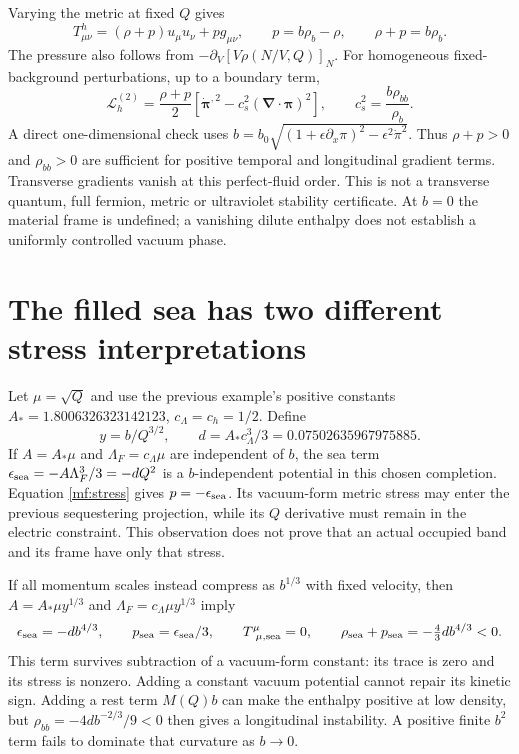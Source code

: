 \documentclass[11pt]{article}
\begin{document}
Varying the metric at fixed $Q$ gives
\begin{equation}
 T_{\mu\nu}^{h}=(\rho+p)u_\mu u_\nu+p g_{\mu\nu},\qquad
 p=b\rho_b-\rho,\qquad \rho+p=b\rho_b.
 \label{mf:stress}
\end{equation}
The pressure also follows from $-\partial_V[V\rho(N/V,Q)]_N$.
For homogeneous fixed-background perturbations, up to a boundary term,
\begin{equation}
 \mathcal L_h^{(2)}=\frac{\rho+p}{2}
 [\dot{\boldsymbol\pi}^{,2}-c_s^2(\boldsymbol\nabla\cdot
 \boldsymbol\pi)^2],\qquad c_s^2=\frac{b\rho_{bb}}{\rho_b}.
 \label{mf:phonon}
\end{equation}
A direct one-dimensional check uses
$b=b_0\sqrt{(1+\epsilon\partial_x\pi)^2-\epsilon^2\dot\pi^2}$.
Thus $\rho+p>0$ and $\rho_{bb}>0$ are sufficient for positive temporal
and longitudinal gradient terms. Transverse gradients vanish at this
perfect-fluid order. This is not a transverse quantum, full fermion,
metric or ultraviolet stability certificate. At $b=0$ the material frame
is undefined; a vanishing dilute enthalpy does not establish a uniformly
controlled vacuum phase.

\section{The filled sea has two different stress interpretations}
Let $\mu=\sqrt Q$ and use the previous example's positive constants
$A_*=1.8006326323142123$, $c_\Lambda=c_h=1/2$. Define
\begin{equation}
 y=b/Q^{3/2},\qquad d=A_*c_\Lambda^3/3
 =0.07502635967975885.
\end{equation}
If $A=A_*\mu$ and $\Lambda_F=c_\Lambda\mu$ are independent of $b$,
the sea term $\epsilon_{\rm sea}=-A\Lambda_F^3/3=-dQ^2$ is a
$b$-independent potential in this chosen completion. Equation
\eqref{mf:stress} gives $p=-\epsilon_{\rm sea}$. Its vacuum-form
metric stress may enter the previous sequestering projection, while its
$Q$ derivative must remain in the electric constraint. This observation
does not prove that an actual occupied band and its frame have only that
stress.

If all momentum scales instead compress as $b^{1/3}$ with fixed velocity,
then $A=A_*\mu y^{1/3}$ and $\Lambda_F=c_\Lambda\mu y^{1/3}$ imply
\begin{equation}
 \epsilon_{\rm sea}=-d b^{4/3},\qquad
 p_{\rm sea}=\epsilon_{\rm sea}/3,\qquad
 T^{\mu}_{\ \mu,\rm sea}=0,\qquad
 \rho_{\rm sea}+p_{\rm sea}=-\tfrac43d b^{4/3}<0.
\end{equation}
This term survives subtraction of a vacuum-form constant: its trace is
zero and its stress is nonzero. Adding a constant vacuum potential cannot
repair its kinetic sign. Adding a rest term $M(Q)b$ can make the enthalpy
positive at low density, but $\rho_{bb}=-4d b^{-2/3}/9<0$ then gives a
longitudinal instability. A positive finite $b^2$ term fails to dominate
that curvature as $b\to0$.
\end{document}
